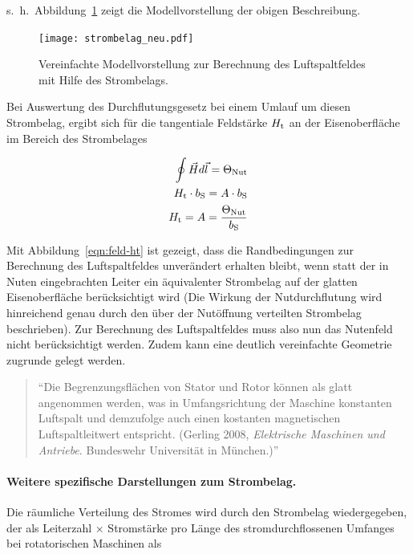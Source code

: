 s.~h.~Abbildung~\ref{fig:strombelag-neu} zeigt die Modellvorstellung der obigen Beschreibung.

\begin{figure}[!h]
\centering
\texttt{[image: strombelag\_neu.pdf]}
\label{fig:strombelag-neu}
\caption{Vereinfachte Modellvorstellung zur Berechnung des Luftspaltfeldes mit Hilfe des Strombelags.}
\end{figure}

Bei Auswertung des Durchflutungsgesetz bei einem Umlauf um diesen Strombelag, ergibt sich für die tangentiale Feldstärke $H_{\mathrm{t}}$ an der Eisenoberfläche im Bereich des Strombelages

\begin{align}
\oint \vec{H}d\vec{l} = \Theta_{\mathrm{Nut}} \\
H_{\mathrm{t}}\cdot b_{\mathrm{S}} = A\cdot b_{\mathrm{S}} \\
H_{\mathrm{t}} = A = \frac{\Theta_{\mathrm{Nut}}}{b_{\mathrm{S}}} \label{eqn:feld-ht}
\end{align}

Mit Abbildung~\ref{eqn:feld-ht} ist gezeigt, dass die Randbedingungen zur Berechnung des Luftspaltfeldes unverändert erhalten bleibt, wenn statt der in Nuten eingebrachten Leiter ein äquivalenter Strombelag auf der glatten Eisenoberfläche berücksichtigt wird (Die Wirkung der Nutdurchflutung wird hinreichend genau durch den über der Nutöffnung verteilten Strombelag beschrieben).
Zur Berechnung des Luftspaltfeldes muss also nun das Nutenfeld nicht berücksichtigt werden.
Zudem kann eine deutlich vereinfachte Geometrie zugrunde gelegt werden.

\begin{quote}
\enquote{Die Begrenzungsflächen von Stator und Rotor können als glatt angenommen werden, was in Umfangsrichtung der Maschine konstanten Luftspalt und demzufolge auch einen kostanten magnetischen Luftspaltleitwert entspricht. (Gerling 2008, \emph{Elektrische Maschinen und Antriebe}. Bundeswehr Universität in München.)}
\end{quote}

\paragraph{Weitere spezifische Darstellungen zum Strombelag.}
Die räumliche Verteilung des Stromes wird durch den Strombelag wiedergegeben, der als Leiterzahl $\times$ Stromstärke pro Länge des stromdurchflossenen Umfanges bei rotatorischen Maschinen als \autocite[S.~199]{hofmann2013}


